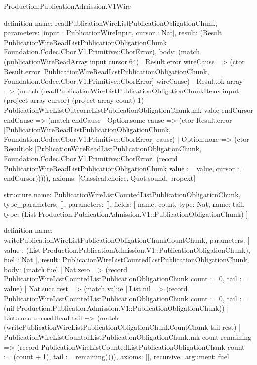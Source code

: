 \begin{lexlean}{Production.PublicationAdmission.V1Wire}
\begin{semanticmodule}
definition{
  name: readPublicationWireListPublicationObligationChunk,
  parameters: [input : PublicationWireInput, cursor : Nat],
  result: (Result PublicationWireReadListPublicationObligationChunk Foundation.Codec.Cbor.V1.Primitive::CborError),
  body: (match (publicationWireReadArray input cursor 64)
    | Result.error wireCause => (ctor Result.error [PublicationWireReadListPublicationObligationChunk, Foundation.Codec.Cbor.V1.Primitive::CborError] wireCause)
    | Result.ok array => (match (readPublicationWireListPublicationObligationChunkItems input (project array cursor) (project array count) 1)
      | PublicationWireListOutcomeListPublicationObligationChunk.mk value endCursor endCause => (match endCause
        | Option.some cause => (ctor Result.error [PublicationWireReadListPublicationObligationChunk, Foundation.Codec.Cbor.V1.Primitive::CborError] cause)
        | Option.none => (ctor Result.ok [PublicationWireReadListPublicationObligationChunk, Foundation.Codec.Cbor.V1.Primitive::CborError] (record PublicationWireReadListPublicationObligationChunk {value := value, cursor := endCursor}))))),
  axioms: [Classical.choice, Quot.sound, propext]
}

structure{
  name: PublicationWireListCountedListPublicationObligationChunk,
  type_parameters: [],
  parameters: [],
  fields: [
    {name: count, type: Nat},
    {name: tail, type: (List Production.PublicationAdmission.V1::PublicationObligationChunk)}
  ]
}

definition{
  name: writePublicationWireListPublicationObligationChunkCountChunk,
  parameters: [
    value : (List Production.PublicationAdmission.V1::PublicationObligationChunk),
    fuel : Nat
  ],
  result: PublicationWireListCountedListPublicationObligationChunk,
  body: (match fuel
    | Nat.zero => (record PublicationWireListCountedListPublicationObligationChunk {count := 0, tail := value})
    | Nat.succ rest => (match value
      | List.nil => (record PublicationWireListCountedListPublicationObligationChunk {count := 0, tail := (nil Production.PublicationAdmission.V1::PublicationObligationChunk)})
      | List.cons unusedHead tail => (match (writePublicationWireListPublicationObligationChunkCountChunk tail rest)
        | PublicationWireListCountedListPublicationObligationChunk.mk count remaining => (record PublicationWireListCountedListPublicationObligationChunk {count := (count + 1), tail := remaining})))),
  axioms: [],
  recursive_argument: fuel
}


\end{semanticmodule}
\end{lexlean}
